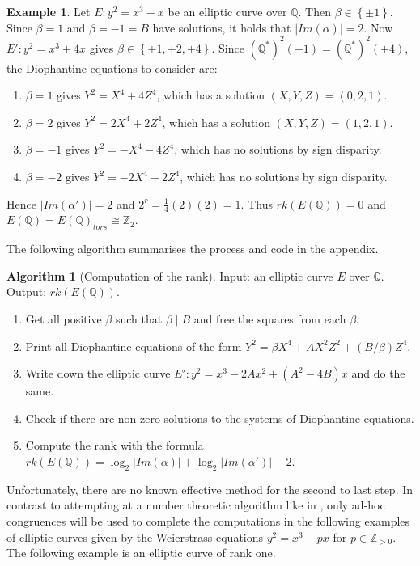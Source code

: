 \documentclass{article}
\newcommand{\Z}{\mathbb{Z}}
\newcommand{\Q}{\mathbb{Q}}
\newcommand{\rb}[1]{\left( #1 \right)}
\newcommand{\cb}[1]{\left\{ #1 \right\}}
\newcommand{\abs}[1]{\left\lvert #1 \right\rvert}
\theoremstyle{definition}\newtheorem*{definition}{Definition}
\theoremstyle{definition}\newtheorem*{example}{Example}
\theoremstyle{definition}\newtheorem*{remark}{Remark}
\newtheorem{algorithm}[proposition]{Algorithm}
\begin{document}
\begin{example}
Let $ E : y^2 = x^3 - x $ be an elliptic curve over $ \Q $. Then $ \beta \in \cb{\pm 1} $. Since $ \beta = 1 $ and $ \beta = -1 = B $ have solutions, it holds that $ \abs{Im\rb{\alpha}} = 2 $. Now $ E' : y^2 = x^3 + 4x $ gives $ \beta \in \cb{\pm 1, \pm 2, \pm 4} $. Since $ \rb{\Q^*}^2\rb{\pm 1} = \rb{\Q^*}^2\rb{\pm 4} $, the Diophantine equations to consider are:
\begin{enumerate}
\item $ \beta = 1 $ gives $ Y^2 = X^4 + 4Z^4 $, which has a solution $ \rb{X, Y, Z} = \rb{0, 2, 1} $.
\item $ \beta = 2 $ gives $ Y^2 = 2X^4 + 2Z^4 $, which has a solution $ \rb{X, Y, Z} = \rb{1, 2, 1} $.
\item $ \beta = -1 $ gives $ Y^2 = -X^4 - 4Z^4 $, which has no solutions by sign disparity.
\item $ \beta = -2 $ gives $ Y^2 = -2X^4 - 2Z^4 $, which has no solutions by sign disparity.
\end{enumerate}
Hence $ \abs{Im\rb{\alpha'}} = 2 $ and $ 2^r = \tfrac{1}{4}\rb{2}\rb{2} = 1 $. Thus $ rk\rb{E\rb{\Q}} = 0 $ and $ E\rb{\Q} = E\rb{\Q}_{tors} \cong \Z_2 $.
\end{example}

The following algorithm summarises the process and code in the appendix.

\begin{algorithm}[Computation of the rank]
Input: an elliptic curve $ E $ over $ \Q $. Output: $ rk\rb{E\rb{\Q}} $.
\begin{enumerate}
\item Get all positive $ \beta $ such that $ \beta \mid B $ and free the squares from each $ \beta $.
\item Print all Diophantine equations of the form $ Y^2 = \beta X^4 + AX^2Z^2 + \rb{B / \beta}Z^4 $.
\item Write down the elliptic curve $ E' : y^2 = x^3 - 2Ax^2 + \rb{A^2 - 4B}x $ and do the same.
\item Check if there are non-zero solutions to the systems of Diophantine equations.
\item Compute the rank with the formula $ rk\rb{E\rb{\Q}} = \log_2\abs{Im\rb{\alpha}} + \log_2\abs{Im\rb{\alpha'}} - 2 $.
\end{enumerate}
\end{algorithm}

Unfortunately, there are no known effective method for the second to last step. In contrast to attempting at a number theoretic algorithm like in \cite{rank}, only ad-hoc congruences will be used to complete the computations in the following examples of elliptic curves given by the Weierstrass equations $ y^2 = x^3 - px $ for $ p \in \Z_{> 0} $. The following example is an elliptic curve of rank one.
\end{document}
